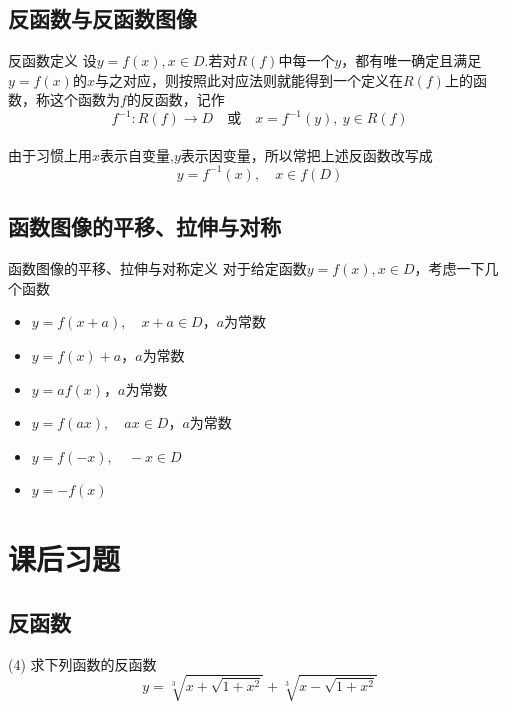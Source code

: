 \documentclass[9pt]{beamer}
\begin{document}
\subsection{反函数与反函数图像}
\begin{frame}{反函数}{定义}
设$y=f(x),x \in D$.若对$R(f)$中每一个$y$，都有唯一确定且满足$y=f(x)$的$x$与之对应，则按照此对应法则就能得到一个定义在$R(f)$上的函数，称这个函数为$f$的反函数，记作\\
\begin{equation*}
    f^{-1}:R(f) \xrightarrow[]{} D \quad \text{或} \quad x=f^{-1}(y),\ y \in R(f)
\end{equation*}
 
由于习惯上用$x$表示自变量,$y$表示因变量，所以常把上述反函数改写成\\
 \begin{equation*}
    y=f^{-1}(x),\quad x \in f(D)
\end{equation*}
\end{frame}

\subsection{函数图像的平移、拉伸与对称}
\begin{frame}{函数图像的平移、拉伸与对称}{定义}
对于给定函数$y=f(x),x \in D$，考虑一下几个函数\\
\begin{itemize}
        \item $y=f(x+a),\quad x+a\in D$，$a$为常数
        \item $y=f(x)+a$，$a$为常数
		\item $y=af(x)$，$a$为常数
		\item $y=f(ax),\quad ax\in D$，$a$为常数
		\item $y=f(-x),\quad -x\in D$
		\item $y=-f(x)$
\end{itemize}
\end{frame}
\section{课后习题}
\subsection{反函数}
\begin{frame}{19}{(4)}
求下列函数的反函数\\
\begin{equation*}
    y=\sqrt[3]{x+\sqrt{1+x^2}}+\sqrt[3]{x-\sqrt{1+x^2}}
\end{equation*}
\end{frame}
\end{document}
